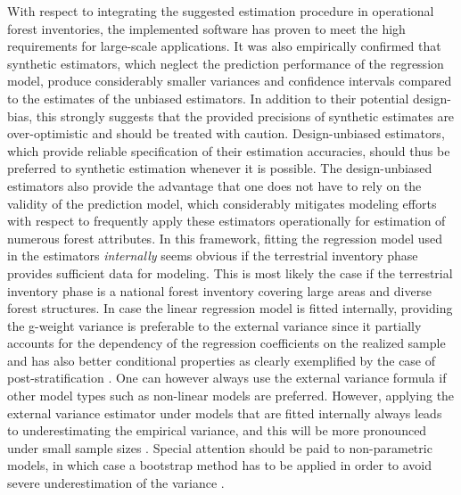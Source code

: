 With respect to integrating the suggested estimation procedure in operational forest inventories, the implemented software has proven to meet the high requirements for large-scale applications. It was also empirically confirmed that synthetic estimators, which neglect the prediction performance of the regression model, produce considerably smaller variances and confidence intervals compared to the estimates of the unbiased estimators. In addition to their potential design-bias, this strongly suggests that the provided precisions of synthetic estimates are over-optimistic and should be treated with caution. Design-unbiased estimators, which provide reliable specification of their estimation accuracies, should thus be preferred to synthetic estimation whenever it is possible. The design-unbiased estimators also provide the advantage that one does not have to rely on the validity of the prediction model, which considerably mitigates modeling efforts with respect to frequently apply these estimators operationally for estimation of numerous forest attributes. In this framework, fitting the regression model used in the estimators \textit{internally} seems obvious if the terrestrial inventory phase provides sufficient data for modeling. This is most likely the case if the terrestrial inventory phase is a national forest inventory covering large areas and diverse forest structures. In case the linear regression model is fitted internally, providing the g-weight variance is preferable to the external variance since it partially accounts for the dependency of the regression coefficients on the realized sample and has also better conditional properties as clearly exemplified by the case of post-stratification \citep{mandallaz2016}. One can however always use the external variance formula if other model types such as non-linear models are preferred. However, applying the external variance estimator under models that are fitted internally always leads to underestimating the empirical variance, and this will be more pronounced under small sample sizes \citep{massey2015_thesis}. Special attention should be paid to non-parametric models, in which case a bootstrap method has to be applied in order to avoid severe underestimation of the variance \citep{massey2015a}.\par


